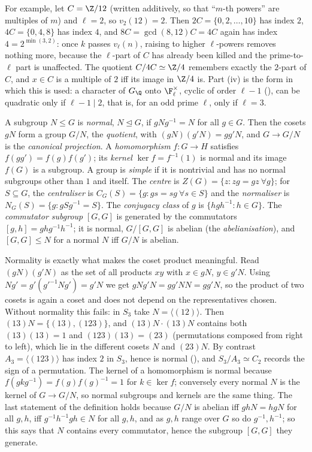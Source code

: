 For example, let $C=\Z/12$ (written additively, so that ``$m$-th powers'' are multiples of $m$) and $\ell=2$, so $v_2(12)=2$. Then
$2C=\{0,2,\dots,10\}$ has index $2$, $4C=\{0,4,8\}$ has index $4$, and $8C=\gcd(8,12)C=4C$ again has index $4=2^{\min(3,2)}$: once $k$ passes
$v_\ell(n)$, raising to higher $\ell$-powers removes nothing more, because the $\ell$-part of $C$ has already been killed and the prime-to-$\ell$ part is
unaffected. The quotient $C/4C\simeq\Z/4$ remembers exactly the $2$-part of $C$, and $x\in C$ is a multiple of $2$ iff its image in $\Z/4$ is. Part (iv) is the
form in which this is used: a character of $G_\Q$ onto $\F_\ell^\times$, cyclic of order $\ell-1$ (), can be quadratic only if
$\ell-1\mid2$, that is, for an odd prime $\ell$, only if $\ell=3$.

\begin{definition}\label{def:groups:normal}
A subgroup $N\le G$ is \emph{normal}, $N\trianglelefteq G$, if $gNg^{-1}=N$ for all $g\in G$. Then the cosets $gN$ form a group $G/N$, the
\emph{quotient}, with $(gN)(g'N)=gg'N$, and $G\to G/N$ is the \emph{canonical projection}. A \emph{homomorphism} $f\colon G\to H$ satisfies
$f(gg')=f(g)f(g')$; its \emph{kernel} $\ker f=f^{-1}(1)$ is normal and its image $f(G)$ is a subgroup. A group is \emph{simple} if it is
nontrivial and has no normal subgroups other than $1$ and itself. The \emph{centre} is $Z(G)=\{z:zg=gz\ \forall g\}$; for $S\subseteq G$, the
\emph{centraliser} is $C_G(S)=\{g:gs=sg\ \forall s\in S\}$ and the \emph{normaliser} is $N_G(S)=\{g:gSg^{-1}=S\}$. The \emph{conjugacy class} of $g$ is
$\{hgh^{-1}:h\in G\}$. The \emph{commutator subgroup} $[G,G]$ is generated by the commutators $[g,h]=ghg^{-1}h^{-1}$; it is normal, $G/[G,G]$
is abelian (the \emph{abelianisation}), and $[G,G]\le N$ for a normal $N$ iff $G/N$ is abelian.
\end{definition}

Normality is exactly what makes the coset product meaningful. Read $(gN)(g'N)$ as the set of all products $xy$ with $x\in gN$, $y\in g'N$. Using
$Ng'=g'(g'^{-1}Ng')=g'N$ we get $gNg'N=gg'NN=gg'N$, so the product of two cosets is again a coset and does not depend on the representatives
chosen. Without normality this fails: in $S_3$ take $N=\langle(12)\rangle$. Then $(13)N=\{(13),(123)\}$, and $(13)N\cdot(13)N$ contains both
$(13)(13)=1$ and $(123)(13)=(23)$ (permutations composed from right to left), which lie in the different cosets $N$ and $(23)N$. By contrast $A_3=\langle(123)\rangle$ has index $2$ in $S_3$, hence is
normal (), and $S_3/A_3\simeq C_2$ records the sign of a permutation. The kernel of a homomorphism is normal because
$f(gkg^{-1})=f(g)f(g)^{-1}=1$ for $k\in\ker f$; conversely every normal $N$ is the kernel of $G\to G/N$, so normal subgroups and kernels are the same thing.
The last statement of the definition holds because $G/N$ is abelian iff $ghN=hgN$ for all $g,h$, iff $g^{-1}h^{-1}gh\in N$ for all $g,h$, and as $g,h$ range over
$G$ so do $g^{-1},h^{-1}$; so this says that $N$ contains every commutator, hence the subgroup $[G,G]$ they generate.

